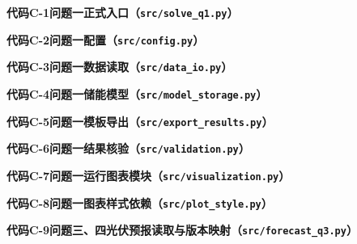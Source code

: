 \documentclass[zihao=-4,a4paper,UTF8,fontset=none]{ctexart}
\begin{document}
\begin{center}\textbf{代码C-1\quad 问题一正式入口（\texttt{src/solve\_q1.py}）}\end{center}

\begin{center}\textbf{代码C-2\quad 问题一配置（\texttt{src/config.py}）}\end{center}

\begin{center}\textbf{代码C-3\quad 问题一数据读取（\texttt{src/data\_io.py}）}\end{center}

\begin{center}\textbf{代码C-4\quad 问题一储能模型（\texttt{src/model\_storage.py}）}\end{center}

\begin{center}\textbf{代码C-5\quad 问题一模板导出（\texttt{src/export\_results.py}）}\end{center}

\begin{center}\textbf{代码C-6\quad 问题一结果核验（\texttt{src/validation.py}）}\end{center}

\begin{center}\textbf{代码C-7\quad 问题一运行图表模块（\texttt{src/visualization.py}）}\end{center}

\begin{center}\textbf{代码C-8\quad 问题一图表样式依赖（\texttt{src/plot\_style.py}）}\end{center}


\begin{center}\textbf{代码C-9\quad 问题三、四光伏预报读取与版本映射（\texttt{src/forecast\_q3.py}）}\end{center}

\end{document}
